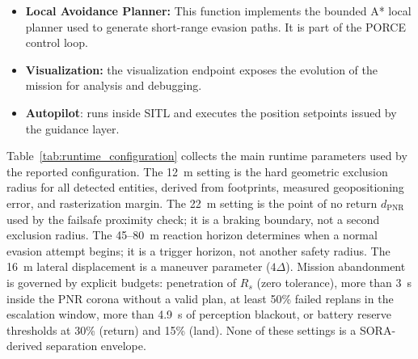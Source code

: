 \documentclass[electronics,article,submit,moreauthors]{Definitions/mdpi}
\DeclareRobustCommand{\deleted}[1]{}%
\DeclareRobustCommand{\added}[1]{#1}%
\DeclareRobustCommand{\deleted}[1]{\textcolor{black}{\sout{#1}}}
\DeclareRobustCommand{\added}[1]{\textcolor{green!50!black}{#1}}
\def\deleted#1{}%
\def\added#1{#1}%
\begin{document}
\begin{itemize}
    \item \textbf{Local Avoidance Planner:} This function implements the bounded A* local planner used to generate short-range evasion paths. It is part of the PORCE control loop.
    \item \textbf{Visualization:} the visualization endpoint \deleted{expose}\added{exposes} the evolution of the \deleted{Mission}\added{mission} for analysis and debugging.
    \item \textbf{Autopilot}: \deleted{It }runs inside SITL and executes the \added{position }setpoints \deleted{position.}\added{issued by the guidance layer.}
\end{itemize}

\added{Table~\ref{tab:runtime_configuration} collects the main runtime parameters used by the reported configuration. The 12~m setting is the hard geometric exclusion radius for all detected entities, derived from footprints, measured geopositioning error, and rasterization margin. The 22~m setting is the point of no return $d_{\mathrm{PNR}}$ used by the failsafe proximity check; it is a braking boundary, not a second exclusion radius. The 45--80~m reaction horizon determines when a normal evasion attempt begins; it is a trigger horizon, not another safety radius. The 16~m lateral displacement is a maneuver parameter ($4\Delta$). Mission abandonment is governed by explicit budgets: penetration of $R_s$ (zero tolerance), more than 3~s inside the PNR corona without a valid plan, at least 50\% failed replans in the escalation window, more than 4.9~s of perception blackout, or battery reserve thresholds at 30\% (return) and 15\% (land). None of these settings is a SORA-derived separation envelope.}
\end{document}
